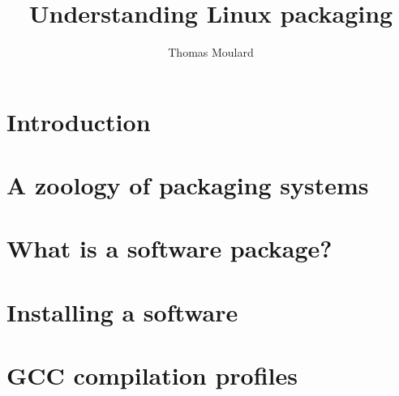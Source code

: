 \documentclass[11pt]{article}
\begin{document}
  \title{Understanding Linux packaging}

  \author{Thomas Moulard}
  \maketitle

  \pagestyle{empty} %
  \thispagestyle{empty}

  \tableofcontents
  \newpage

  \section{Introduction}
  \label{intro}
  

  \section{A zoology of packaging systems}
  \label{zoology}
  

  \section{What is a software package?}
  \label{package}
  

  \section{Installing a software}
  \label{install}
  

  \appendix
  \newpage

  \section{GCC compilation profiles}
  \label{compilation_profiles}
  

%  
\end{document}

